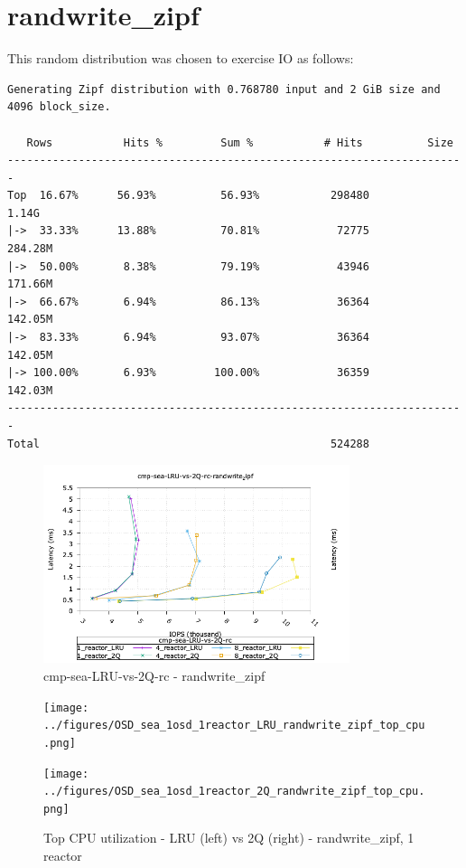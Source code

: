 \pagebreak
\section{randwrite\_zipf}

This random distribution was chosen to exercise IO as follows:

\begin{verbatim}
Generating Zipf distribution with 0.768780 input and 2 GiB size and 4096 block_size.

   Rows           Hits %         Sum %           # Hits          Size
-----------------------------------------------------------------------
Top  16.67%      56.93%          56.93%           298480          1.14G
|->  33.33%      13.88%          70.81%            72775        284.28M
|->  50.00%       8.38%          79.19%            43946        171.66M
|->  66.67%       6.94%          86.13%            36364        142.05M
|->  83.33%       6.94%          93.07%            36364        142.05M
|-> 100.00%       6.93%         100.00%            36359        142.03M
-----------------------------------------------------------------------
Total                                             524288
\end{verbatim}

\begin{figure}[!ht]
\centering
\includegraphics[width=0.8\textwidth]{../figures/cmp_sea_LRU_vs_2Q_rc_randwrite_zipf_iops_vs_lat.png}
\caption{cmp-sea-LRU-vs-2Q-rc - randwrite\_zipf}
\label{fig:cmp_sea_LRU_vs_2Q_rc_randwrite_zipf}
\end{figure}

\begin{figure}[!ht]
  \centering
  \begin{minipage}{.5\textwidth}
  \centering
    \texttt{[image: ../figures/OSD\_sea\_1osd\_1reactor\_LRU\_randwrite\_zipf\_top\_cpu.png]}
  \end{minipage}%
  \begin{minipage}{.5\textwidth}
  \centering
    \texttt{[image: ../figures/OSD\_sea\_1osd\_1reactor\_2Q\_randwrite\_zipf\_top\_cpu.png]}
  \end{minipage}%
  \caption{Top CPU utilization - LRU (left) vs 2Q (right) - randwrite\_zipf, 1 reactor}
  \label{figure:1-reactor-cpu-randwrite_zipf}
\end{figure}


